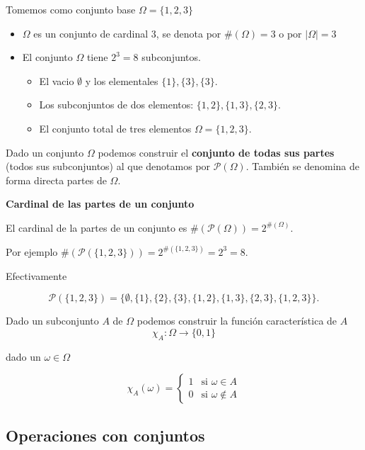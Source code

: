 \documentclass[]{book}
\providecommand{\tightlist}{%
  \setlength{\itemsep}{0pt}\setlength{\parskip}{0pt}}
\begin{document}
Tomemos como conjunto base \(\Omega=\{1,2,3\}\)

\begin{itemize}
\tightlist
\item
  \(\Omega\) es un conjunto de cardinal 3, se denota por \(\#(\Omega)=3\) o por \(|\Omega|=3\)
\item
  El conjunto \(\Omega\) tiene \(2^3=8\) subconjuntos.

  \begin{itemize}
  \tightlist
  \item
    El vacio \(\emptyset\) y los elementales \(\{1\},\{3\},\{3\}\).
  \item
    Los subconjuntos de dos elementos: \(\{1,2\},\{1,3\},\{2,3\}\).
  \item
    El conjunto total de tres elementos \(\Omega=\{1,2,3\}.\)
  \end{itemize}
\end{itemize}

Dado un conjunto \(\Omega\) podemos construir el \textbf{conjunto de todas sus partes} (todos sus subconjuntos) al que denotamos por \(\mathcal{P}(\Omega)\). También se denomina de forma directa partes de \(\Omega\).

 \textbf{Cardinal de las partes de un conjunto}

El cardinal de la partes de un conjunto es \(\#(\mathcal{P}(\Omega))=2^{\#(\Omega)}.\)

Por ejemplo \(\#\left(\mathcal{P}(\{1,2,3\})\right)=2^{\#(\{1,2,3\})}=2^3=8.\)

Efectivamente

\[\mathcal{P}(\{1,2,3\})=\{\emptyset,\{1\},\{2\},\{3\},\{1,2\},\{1,3\},\{2,3\},\{1,2,3\}\}.\]

Dado un subconjunto \(A\) de \(\Omega\) podemos construir la función característica de \(A\)
\[\chi_A:\Omega \to \{0,1\}\]

dado un \(\omega\in \Omega\)

\[
\chi_A(\omega)=
\left\{
\begin{array}{ll}
1 &  \mbox{si }\omega \in A\\
0 &  \mbox{si }\omega \not\in A
\end{array}
\right.
\]

\hypertarget{operaciones-con-conjuntos}{%
\subsection{Operaciones con conjuntos}\label{operaciones-con-conjuntos}}
\end{document}
